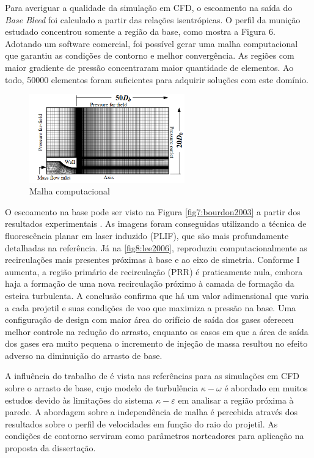 Para averiguar a qualidade da simulação em CFD, o escoamento na saída do \textit{Base Bleed} foi calculado a partir das relações isentrópicas. O perfil da munição estudado concentrou somente a região da base, como mostra a Figura 6. Adotando um software comercial, foi possível gerar uma malha computacional que garantiu as condições de contorno e melhor convergência. As regiões com maior gradiente de pressão concentraram maior quantidade de elementos. Ao todo, \num{50000} elementos foram suficientes para adquirir soluções com este domínio.

\begin{figure}[!ht]
	\centering
	\includegraphics[width=0.6\textwidth]{foto06-malha-lee&kim.png}
	\caption[Malha computacional]{Malha computacional \cite{Lee2006Sep}}
	\label{fig6:lee2006}
\end{figure}
	
O escoamento na base pode ser visto na Figura \ref{fig7:bourdon2003} a partir dos resultados experimentais \cite{Bourdon2003Feb}. As imagens foram conseguidas utilizando a técnica de fluorescência planar em laser induzido (PLIF), que são mais profundamente detalhadas na referência. Já na \autoref{fig8:lee2006}, \citeauthor{Lee2006Sep} reproduziu computacionalmente as recirculações mais presentes próximas à base e ao eixo de simetria. Conforme I aumenta, a região primário de recirculação (PRR) é praticamente nula, embora haja a formação de uma nova recirculação próximo à camada de formação da esteira turbulenta. A conclusão confirma que há um valor adimensional que varia a cada projetil e suas condições de voo que maximiza a pressão na base. Uma configuração de design com maior área do orifício de saída dos gases ofereceu melhor controle na redução do arrasto, enquanto os casos em que a área de saída dos gases era muito pequena o incremento de injeção de massa resultou no efeito adverso na diminuição do arrasto de base. 

A influência do trabalho de \citeauthor{Lee2006Sep} é vista nas referências para as simulações em CFD sobre o arrasto de base, cujo modelo de turbulência \(\kappa-\omega\) é abordado em muitos estudos devido às limitações do sistema \(\kappa-\varepsilon\) em analisar a região próxima à parede. A abordagem sobre a independência de malha é percebida através dos resultados sobre o perfil de velocidades em função do raio do projetil. As condições de contorno serviram como parâmetros norteadores para aplicação na proposta da dissertação.


